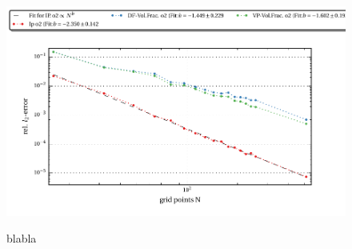 \begin{figure}[!pb]
  \centering
  \includegraphics{gfx/immersed_boundary/hpflow/theo/all.pdf}\label{fig:hpflow_allgc_theo}
  \caption{blabla}
\end{figure}

\newpage

